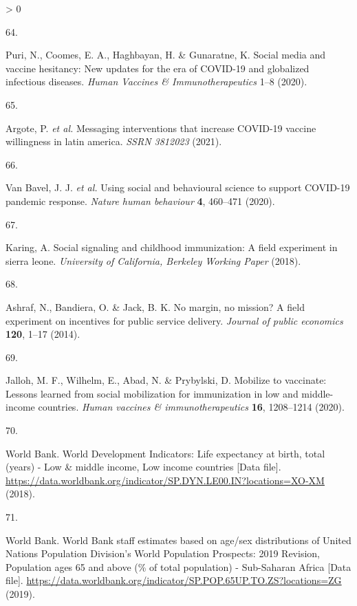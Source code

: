 \documentclass[
  12pt,
]{article}
\newlength{\cslhangindent}
\newlength{\csllabelwidth}
\newenvironment{CSLReferences}[2] %
 {%
  \setlength{\parindent}{0pt}
  \ifodd #1 \everypar{\setlength{\hangindent}{\cslhangindent}}\ignorespaces\fi
  \ifnum #2 > 0
  \setlength{\parskip}{#2\baselineskip}
  \fi
 }%
 {}
\newcommand{\CSLLeftMargin}[1]{\parbox[t]{\csllabelwidth}{#1}}
\newcommand{\CSLRightInline}[1]{\parbox[t]{\linewidth - \csllabelwidth}{#1}\break}
\begin{document}
\begin{CSLReferences}{0}{0}
\leavevmode\hypertarget{ref-puri2020social}{}%
\CSLLeftMargin{64. }
\CSLRightInline{Puri, N., Coomes, E. A., Haghbayan, H. \& Gunaratne, K. Social media and vaccine hesitancy: New updates for the era of COVID-19 and globalized infectious diseases. \emph{Human Vaccines \& Immunotherapeutics} 1--8 (2020).}

\leavevmode\hypertarget{ref-argote2021messaging}{}%
\CSLLeftMargin{65. }
\CSLRightInline{Argote, P. \emph{et al.} Messaging interventions that increase COVID-19 vaccine willingness in latin america. \emph{SSRN 3812023} (2021).}

\leavevmode\hypertarget{ref-van2020using}{}%
\CSLLeftMargin{66. }
\CSLRightInline{Van Bavel, J. J. \emph{et al.} Using social and behavioural science to support COVID-19 pandemic response. \emph{Nature human behaviour} \textbf{4}, 460--471 (2020).}

\leavevmode\hypertarget{ref-karing2018social}{}%
\CSLLeftMargin{67. }
\CSLRightInline{Karing, A. Social signaling and childhood immunization: A field experiment in sierra leone. \emph{University of California, Berkeley Working Paper} (2018).}

\leavevmode\hypertarget{ref-ashraf2014no}{}%
\CSLLeftMargin{68. }
\CSLRightInline{Ashraf, N., Bandiera, O. \& Jack, B. K. No margin, no mission? A field experiment on incentives for public service delivery. \emph{Journal of public economics} \textbf{120}, 1--17 (2014).}

\leavevmode\hypertarget{ref-jalloh2020mobilize}{}%
\CSLLeftMargin{69. }
\CSLRightInline{Jalloh, M. F., Wilhelm, E., Abad, N. \& Prybylski, D. Mobilize to vaccinate: Lessons learned from social mobilization for immunization in low and middle-income countries. \emph{Human vaccines \& immunotherapeutics} \textbf{16}, 1208--1214 (2020).}

\leavevmode\hypertarget{ref-wbage}{}%
\CSLLeftMargin{70. }
\CSLRightInline{World Bank. {World Development Indicators: Life expectancy at birth, total (years) - Low \& middle income, Low income countries {[}Data file{]}}. \url{https://data.worldbank.org/indicator/SP.DYN.LE00.IN?locations=XO-XM} (2018).}

\leavevmode\hypertarget{ref-WorldBanksubSahara}{}%
\CSLLeftMargin{71. }
\CSLRightInline{World Bank. {World Bank staff estimates based on age/sex distributions of United Nations Population Division's World Population Prospects: 2019 Revision, Population ages 65 and above (\% of total population) - Sub-Saharan Africa {[}Data file{]}}. \url{https://data.worldbank.org/indicator/SP.POP.65UP.TO.ZS?locations=ZG} (2019).}


\end{CSLReferences}
\end{document}
